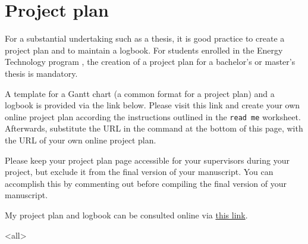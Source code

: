 \chapter*{Project plan}

\begin{explanation}
For a substantial undertaking such as a thesis, it is good practice to create a project plan and to maintain a logbook. For students enrolled in the Energy Technology program , the creation of a project plan for a bachelor's or master's thesis is mandatory.

A template for a Gantt chart (a common format for a project plan) and a logbook is provided via the link below. Please visit this link and create your own online project plan according the instructions outlined in the \texttt{read me} worksheet. Afterwards, substitute the URL in the  command at the bottom of this page, with the URL of your own online project plan.

Please keep your project plan page accessible for your supervisors during your project, but exclude it from the final version of your manuscript. You can accomplish this by commenting out  before compiling the final version of your manuscript.
\end{explanation}

My project plan and logbook can be consulted online via \href{https://docs.google.com/spreadsheets/d/1pu0IqxlnQ26Bf9W0bGTZMhN7IIY9y6iuIB5PA2sFrTE/edit?gid=1692148183#gid=1692148183}{this link}. %

\mode<all> %




